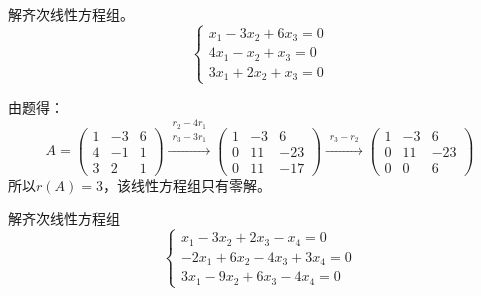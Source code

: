 \documentclass[a4paper]{report}
\begin{document}
\EX 解齐次线性方程组。
\begin{equation*}
\begin{cases}
x_1-3x_2+6x_3=0\\
4x_1-x_2+x_3=0\\
3x_1+2x_2+x_3=0
\end{cases}
\end{equation*}

\begin{jie}
由题得：
\begin{equation*}
A=
\begin{pmatrix}
1&-3&6\\
4&-1&1\\
3&2&1
\end{pmatrix}
\xrightarrow{\substack{r_2-4r_1\\ r_3-3r_1}}{
\begin{pmatrix}
1&-3&6\\
0&11&-23\\
0&11&-17
\end{pmatrix}
}\xrightarrow{\substack{r_3-r_2}}{
\begin{pmatrix}
1&-3&6\\
0&11&-23\\
0&0&6
\end{pmatrix}
}
\end{equation*}
所以$r(A)=3$，该线性方程组只有零解。
\end{jie}

\EX 解齐次线性方程组
\begin{equation*}
\begin{cases}
x_1-3x_2+2x_3-x_4=0\\
-2x_1+6x_2-4x_3+3x_4=0\\
3x_1-9x_2+6x_3-4x_4=0
\end{cases}
\end{equation*}
\end{document}
